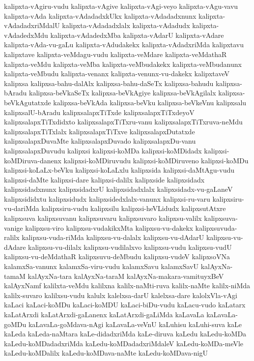{kalipxta-vAgiru-vudu
kalipxta-vAgive
kalipxta-vAgi-veyo
kalipxta-vAgu-vavu
kalipxta-vAda
kalipxta-vAdadadxkUkx
kalipxta-vAdadadxnunx
kalipxta-vAdadadxriMdalU
kalipxta-vAdadadxlalx
kalipxta-vAdadudx
kalipxta-vAdadedxMdu
kalipxta-vAdadedxMba
kalipxta-vAdarU
kalipxta-vAdare
kalipxta-vAda-vu-gaLu
kalipxta-vAdudakekx
kalipxta-vAdadxriMda
kalipxtavu
kalipxtave
kalipxta-veMdagu-vudu
kalipxta-veMdare
kalipxta-veMdathaR
kalipxta-veMdu
kalipxta-veMba
kalipxta-veMbudakekx
kalipxta-veMbudanunx
kalipxta-veMbudu
kalipxta-venanx
kalipxta-venunx-vu-dakekx
kalipxtaveV
kalipxsa
kalipxsa-bahu-dalAlx
kalipxsa-bahu-daSeTx
kalipxsa-bahudu
kalipxsa-bAradu
kalipxsa-beVkaSeTx
kalipxsa-beVkAgiye
kalipxsa-beVkAgilalx
kalipxsa-beVkAgutatxde
kalipxsa-beVkAda
kalipxsa-beVku
kalipxsa-beVkeVnu
kalipxsalu
kalipxsalU-bAradu
kalipxsalapxTiTxde
kalipxsalapxTiTxdeyoV
kalipxsalapxTiTxdidxto
kalipxsalapxTiTxru-vanu
kalipxsalapxTiTxruva-neMdu
kalipxsalapxTiTxlalx
kalipxsalapxTiTxve
kalipxsalapxDutatxde
kalipxsalapxDuvaMte
kalipxsalapxDuvado
kalipxsalapxDu-vanu
kalipxsalapxDuvudu
kalipxsi
kalipxsi-koMDa
kalipxsi-koMDidadx
kalipxsi-koMDiruva-danenx
kalipxsi-koMDiruvudu
kalipxsi-koMDiruveno
kalipxsi-koMDu
kalipxsi-koLaLx-beVku
kalipxsi-koLaLxlu
kalipxsida
kalipxsi-daMtAgu-vudu
kalipxsi-daMte
kalipxsi-dare
kalipxsi-dalilx
kalipxside
kalipxsidadx
kalipxsidadxnunx
kalipxsidadxrU
kalipxsidadxlalx
kalipxsidadx-vu-gaLaneV
kalipxsididxtu
kalipxsidudx
kalipxsidedxlalx-vanunx
kalipxsi-ru-varu
kalipxsiru-vu-dariMda
kalipxsiru-vudu
kalipxsilu
kalipxsi-heVLidudx
kalipxsutAtxre
kalipxsuva
kalipxsuvanu
kalipxsuvaru
kalipxsuvaro
kalipxsu-valilx
kalipxsuva-vanige
kalipxsu-viro
kalipxsu-vudakikxMta
kalipxsu-vu-dakekx
kalipxsuvuda-ralilx
kalipxsu-vuda-riMda
kalipxsu-vu-dalalx
kalipxsu-vu-dAdarU
kalipxsu-vu-dAdare
kalipxsu-vu-dilalx
kalipxsu-vudilalxvo
kalipxsu-vudu
kalipxsu-vudU
kalipxsu-vu-deMdathaR
kalipxsuvu-deMbudu
kalipxsu-vudeV
kalipxsoVNa
kalamxSa-vanunx
kalamxSa-viru-vudu
kalamxSavu
kalamxSavU
kalAyxNa-tamaM
kalAyxNa-tara
kalAyxNa-taraM
kalAyxNa-makara-vamituyxBeV
kalAyxNamf
kalilxta-veMdu
kalilxna
kalilx-naMti-ruva
kalilx-naMte
kalilx-niMda
kalilx-suvaro
kalilxsu-vudu
kalulx
kalelxsa-darU
kalelxsa-dare
kalolxVla-vAgi
kaLaci
kaLaci-koMDu
kaLaci-koMDU
kaLaci-biDu-vudu
kaLacu-vudo
kaLatarx
kaLatArxdi
kaLatArxdi-gaLanenx
kaLatArxdi-gaLiMda
kaLavaLa
kaLavaLa-goMDu
kaLavaLa-goMdava-nAgi
kaLavaLa-veVnU
kaLuhisu
kaLuhi-suva
kaLe
kaLeda
kaLeda-naMtara
kaLe-didadxriMda
kaLe-diruva
kaLedu
kaLedu-koMDa
kaLedu-koMDadadxriMda
kaLedu-koMDadadxriMdaleV
kaLedu-koMDa-meVle
kaLedu-koMDalilx
kaLedu-koMDava-naMte
kaLedu-koMDava-nigU
}
